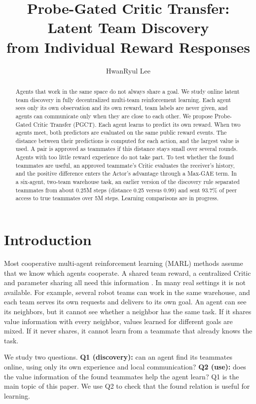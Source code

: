 \documentclass{article}
\title{Probe-Gated Critic Transfer: Latent Team Discovery\\from Individual Reward Responses}
\author{HwanRyul Lee}
\begin{document}
\maketitle


\begin{abstract}
Agents that work in the same space do not always share a goal. We study online latent team discovery in fully decentralized multi-team reinforcement learning. Each agent sees only its own observation and its own reward, team labels are never given, and agents can communicate only when they are close to each other. We propose Probe-Gated Critic Transfer (PGCT). Each agent learns to predict its own reward. When two agents meet, both predictors are evaluated on the same public reward events. The distance between their predictions is computed for each action, and the largest value is used. A pair is approved as teammates if this distance stays small over several rounds. Agents with too little reward experience do not take part. To test whether the found teammates are useful, an approved teammate's Critic evaluates the receiver's history, and the positive difference enters the Actor's advantage through a Max-GAE term. In a six-agent, two-team warehouse task, an earlier version of the discovery rule separated teammates from about 0.25M steps (distance 0.25 versus 0.99) and sent 93.7\% of peer access to true teammates over 5M steps. Learning comparisons are in progress.
\end{abstract}

\section{Introduction}
Most cooperative multi-agent reinforcement learning (MARL) methods assume that we know which agents cooperate. A shared team reward, a centralized Critic and parameter sharing all need this information \cite{mappo,seps}. In many real settings it is not available. For example, several robot teams can work in the same warehouse, and each team serves its own requests and delivers to its own goal. An agent can see its neighbors, but it cannot see whether a neighbor has the same task. If it shares value information with every neighbor, values learned for different goals are mixed. If it never shares, it cannot learn from a teammate that already knows the task.

We study two questions. \textbf{Q1 (discovery):} can an agent find its teammates online, using only its own experience and local communication? \textbf{Q2 (use):} does the value information of the found teammates help the agent learn? Q1 is the main topic of this paper. We use Q2 to check that the found relation is useful for learning.
\end{document}
